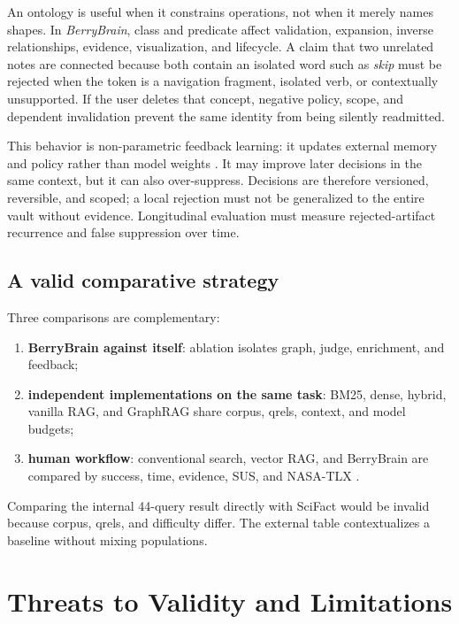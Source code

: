 \documentclass{sbc2023}
\newcommand{\BerryBrain}{\textit{BerryBrain}}
\begin{document}
An ontology is useful when it constrains operations, not when it merely names shapes. In
\BerryBrain, class and predicate affect validation, expansion, inverse relationships, evidence,
visualization, and lifecycle. A claim that two unrelated notes are connected because both contain
an isolated word such as \textit{skip} must be rejected when the token is a navigation fragment,
isolated verb, or contextually unsupported. If the user deletes that concept, negative policy,
scope, and dependent invalidation prevent the same identity from being silently readmitted.

This behavior is non-parametric feedback learning: it updates external memory and policy rather
than model weights \cite{gutierrez2025hipporag2}. It may improve later decisions in the same
context, but it can also over-suppress. Decisions are therefore versioned, reversible, and scoped;
a local rejection must not be generalized to the entire vault without evidence. Longitudinal
evaluation must measure rejected-artifact recurrence and false suppression over time.

\subsection{A valid comparative strategy}

Three comparisons are complementary:
\begin{enumerate}
  \item \textbf{BerryBrain against itself}: ablation isolates graph, judge, enrichment, and feedback;
  \item \textbf{independent implementations on the same task}: BM25, dense, hybrid, vanilla RAG,
  and GraphRAG share corpus, qrels, context, and model budgets;
  \item \textbf{human workflow}: conventional search, vector RAG, and BerryBrain are compared by
  success, time, evidence, SUS, and NASA-TLX \cite{brooke1996sus,hart1988nasatlx}.
\end{enumerate}

Comparing the internal 44-query result directly with SciFact would be invalid because corpus,
qrels, and difficulty differ. The external table contextualizes a baseline without mixing
populations.

\section{Threats to Validity and Limitations}
\label{sec:threats}
\end{document}
